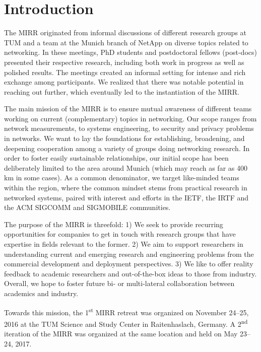 \section{Introduction}\label{sec:introduction}


The \ac{MIRR} originated from informal discussions of different research groups at \ac{TUM} and a team at the Munich branch of NetApp\cite{netapp} on diverse topics related to networking.
In these meetings, PhD students and postdoctoral fellows (post-docs) presented their respective research, including both work in progress as well as polished results.
The meetings created an informal setting for intense and rich exchange among participants.
We realized that there was notable potential in reaching out further, which eventually led to the instantiation of the \ac{MIRR}.

The main mission of the \ac{MIRR} is to ensure mutual awareness of different
teams working on current (complementary) topics in networking. Our scope ranges from network measurements, to systems engineering, to security and privacy problems in networks.
We want to lay
the foundations for establishing, broadening, and deepening cooperation among
a variety of groups doing networking research. In order to foster easily
sustainable relationships, our initial scope has been deliberately limited to
the area around Munich (which may reach as far as 400 km in some cases).  As a
common denominator, we target like-minded teams within the region, where the
common mindset stems from practical research in networked systems, paired with
interest and efforts in the \ac{IETF}, the \ac{IRTF} and the ACM SIGCOMM and
SIGMOBILE communities.

The purpose of the \ac{MIRR} is threefold: 1) We seek to provide recurring
opportunities for companies to get in touch with research groups that have
expertise in fields relevant to the former.  2) We aim to support researchers
in understanding current and emerging research and engineering problems from
the commercial development and deployment perspectives.  3) We like to offer
reality feedback to academic researchers and out-of-the-box ideas to those
from industry.  Overall, we hope to foster future bi- or multi-lateral
collaboration between academics and industry.

Towards this mission, the 1\textsuperscript{st} \ac{MIRR} retreat was organized
on November 24--25, 2016 at the \ac{TUM} Science and Study Center in
Raitenhaslach, Germany\cite{raitenhaslach}. A 2\textsuperscript{nd} iteration of the \ac{MIRR} was
organized at the same location and held on May 23--24, 2017.

